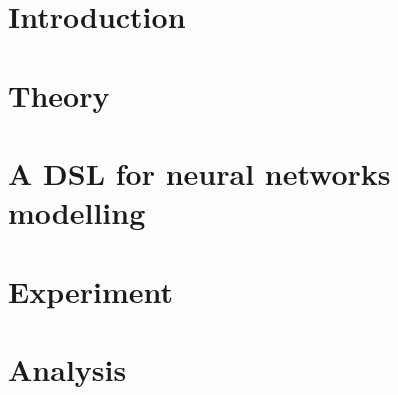 \documentclass[a4paper,oneside]{memoir}
\begin{document}
\mainmatter
\chapter{Introduction} \label{sec:intro}
  

\chapter{Theory} \label{sec:theory}
  

\chapter{A DSL for neural networks modelling} \label{sec:dsl}
  

\chapter{Experiment} \label{sec:experiment}
%  

\chapter{Analysis} \label{sec:analysis}

\end{document}
